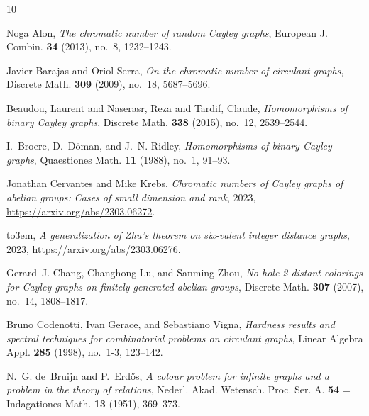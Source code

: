 \documentclass{article}
\theoremstyle{definition}
\theoremstyle{remark}
\begin{document}
\providecommand{\MR}[1]{}
\providecommand{\bysame}{\leavevmode\hbox to3em{\hrulefill}\thinspace}
\providecommand{\MR}{\relax\ifhmode\unskip\space\fi MR }
\providecommand{\MRhref}[2]{%
  \href{http://www.ams.org/mathscinet-getitem?mr=#1}{#2}
}
\providecommand{\href}[2]{#2}
\begin{thebibliography}{10}

Noga Alon, \emph{The chromatic number of random {C}ayley graphs}, European J.
  Combin. \textbf{34} (2013), no.~8, 1232--1243. \MR{3082195}

Javier Barajas and Oriol Serra, \emph{On the chromatic number of circulant
  graphs}, Discrete Math. \textbf{309} (2009), no.~18, 5687--5696. \MR{2567972}

Beaudou, Laurent and Naserasr, Reza and Tardif, Claude, \emph{Homomorphisms of binary {C}ayley graphs}, Discrete Math. \textbf{338} (2015), no.~12, 2539--2544. \MR{3373358}
  
I.~Broere, D.~D\"{o}man, and J.~N. Ridley, \emph{Homomorphisms of binary {C}ayley graphs}, Quaestiones Math. \textbf{11}
  (1988), no.~1, 91--93. \MR{931024}

Jonathan Cervantes and Mike Krebs, \emph{Chromatic numbers of {C}ayley graphs of
  abelian groups: Cases of small dimension and rank}, 2023,
  \url{https://arxiv.org/abs/2303.06272}.

\bysame, \emph{A generalization of {Z}hu's theorem on six-valent integer
  distance graphs}, 2023, \url{https://arxiv.org/abs/2303.06276}.

Gerard~J. Chang, Changhong Lu, and Sanming Zhou, \emph{No-hole 2-distant
  colorings for {C}ayley graphs on finitely generated abelian groups}, Discrete
  Math. \textbf{307} (2007), no.~14, 1808--1817. \MR{2316819}

Bruno Codenotti, Ivan Gerace, and Sebastiano Vigna, \emph{Hardness results and
  spectral techniques for combinatorial problems on circulant graphs}, Linear
  Algebra Appl. \textbf{285} (1998), no.~1-3, 123--142. \MR{1653503}

N.~G. de~Bruijn and P.~Erd\H{o}s, \emph{A colour problem for infinite graphs
  and a problem in the theory of relations}, Nederl. Akad. Wetensch. Proc. Ser.
  A. {\bf 54} = Indagationes Math. \textbf{13} (1951), 369--373. \MR{0046630}


\end{thebibliography}
\end{document}

